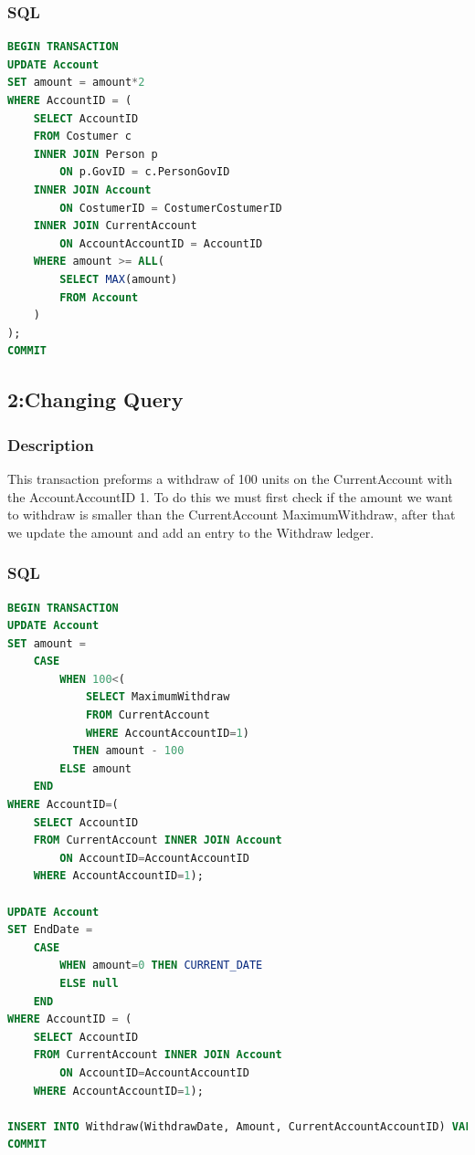 \documentclass[a4paper, 10pt]{article}
\begin{document}
\subsubsection{SQL}
\begin{lstlisting}[language=SQL]
BEGIN TRANSACTION
UPDATE Account 
SET amount = amount*2 
WHERE AccountID = (
    SELECT AccountID 
    FROM Costumer c 
    INNER JOIN Person p 
        ON p.GovID = c.PersonGovID 
    INNER JOIN Account 
        ON CostumerID = CostumerCostumerID 
    INNER JOIN CurrentAccount 
        ON AccountAccountID = AccountID 
    WHERE amount >= ALL(
        SELECT MAX(amount) 
        FROM Account 
    )
);
COMMIT
\end{lstlisting}

\subsection{2:Changing Query}
\subsubsection{Description}
This transaction preforms a withdraw of 100 units on the CurrentAccount with the AccountAccountID 1. To do this we must first check if the amount we want to withdraw is smaller than the CurrentAccount MaximumWithdraw, after that we update the amount and add an entry to the Withdraw ledger.

\subsubsection{SQL}
\begin{lstlisting}[language=SQL]
BEGIN TRANSACTION
UPDATE Account
SET amount =
    CASE 
        WHEN 100<(
            SELECT MaximumWithdraw 
            FROM CurrentAccount 
            WHERE AccountAccountID=1) 
          THEN amount - 100
        ELSE amount
    END
WHERE AccountID=(
    SELECT AccountID 
    FROM CurrentAccount INNER JOIN Account 
        ON AccountID=AccountAccountID 
    WHERE AccountAccountID=1);

UPDATE Account
SET EndDate =
    CASE 
        WHEN amount=0 THEN CURRENT_DATE
        ELSE null
    END
WHERE AccountID = (
    SELECT AccountID 
    FROM CurrentAccount INNER JOIN Account 
        ON AccountID=AccountAccountID 
    WHERE AccountAccountID=1);

INSERT INTO Withdraw(WithdrawDate, Amount, CurrentAccountAccountID) VALUES(CURRENT_DATE, 100, 1);
COMMIT
\end{lstlisting}
\end{document}
